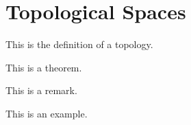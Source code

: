 \chapter{Topological Spaces}

\begin{definition}[Topology]
	This is the definition of a topology.
\end{definition}

\begin{theorem}
	This is a theorem.
\end{theorem}

\begin{remark}
	This is a remark.
\end{remark}

\begin{example}
	This is an example.
\end{example}

